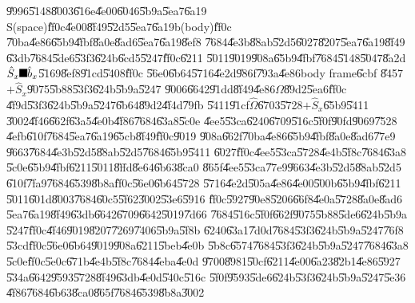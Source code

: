 \documentclass[12pt]{article}
\begin{document}
\begin{figure}[th]
\caption{{}}
\label{firstfig}
\begin{center}
\end{center}
\end{figure}
\bigskip

\U{9996}\U{5148}\U{8003}\U{616e}\U{4e00}\U{6046}\U{5b9a}\U{5ea7}\U{6a19}%
S(space)\U{ff0c}\U{4e00}\U{8f49}\U{52d5}\U{5ea7}\U{6a19}b(body)\U{ff0c}%
\U{70ba}\U{4e86}\U{65b9}\U{4fbf}\U{8a0e}\U{8ad6}\U{5ea7}\U{6a19}\U{8ef8}%
\U{7684}\U{4e3b}\U{88ab}\U{52d5}\U{6027}\U{8207}\U{5ea7}\U{6a19}\U{8f49}%
\U{63db}\U{7684}\U{5de6}\U{53f3}\U{624b}\U{6cd5}\U{5247}\U{ff0c}\U{6211}%
\U{5011}\U{9019}\U{908a}\U{65b9}\U{4fbf}\U{7684}\U{5148}\U{5047}\U{8a2d}$%
\hat{S}_{x}\U{ff0c} \hat{b}_{x}$\U{5169}\U{8ef8}\U{91cd}\U{5408}\U{ff0c}%
\U{56e0}\U{6b64}\U{5716}\U{4e2d}\U{986f}\U{793a}\U{4e86}body frame\U{6cbf}%
\U{8457}$+\hat{S}_{x}$\U{9075}\U{5b88}\U{53f3}\U{624b}\U{5b9a}\U{5247}%
\U{9006}\U{6642}\U{91dd}\U{8f49}\U{4e86}$\Omega $\U{89d2}\U{5ea6}\U{ff0c}%
\U{4f9d}\U{53f3}\U{624b}\U{5b9a}\U{5247}\U{6b64}\U{89d2}\U{4f4d}\U{79fb}%
\U{5411}\U{91cf}$\hat{\Omega}$\U{6703}\U{5728}$+\hat{S}_{x}$\U{65b9}\U{5411}%
\U{3002}\U{4f46}\U{662f}\U{63a5}\U{4e0b}\U{4f86}\U{7684}\U{63a8}\U{5c0e}%
\U{4ee5}\U{53ca}\U{6240}\U{6709}\U{516c}\U{5f0f}\U{90fd}\U{9069}\U{7528}%
\U{4efb}\U{610f}\U{7684}\U{5ea7}\U{6a19}\U{65cb}\U{8f49}\U{ff0c}\U{9019}%
\U{908a}\U{662f}\U{70ba}\U{4e86}\U{65b9}\U{4fbf}\U{8a0e}\U{8ad6}\U{77e9}%
\U{9663}\U{7684}\U{4e3b}\U{52d5}\U{88ab}\U{52d5}\U{7684}\U{65b9}\U{5411}%
\U{6027}\U{ff0c}\U{4ee5}\U{53ca}\U{5728}\U{4e4b}\U{5f8c}\U{7684}\U{63a8}%
\U{5c0e}\U{65b9}\U{4fbf}\U{6211}\U{5011}\U{8ffd}\U{8e64}\U{6b63}\U{8ca0}%
\U{865f}\U{4ee5}\U{53ca}\U{77e9}\U{9663}\U{4e3b}\U{52d5}\U{88ab}\U{52d5}%
\U{610f}\U{7fa9}\U{7684}\U{6539}\U{8b8a}\U{ff0c}\U{56e0}\U{6b64}\U{5728}%
\U{5716}\U{4e2d}\U{505a}\U{4e86}\U{4e00}\U{500b}\U{65b9}\U{4fbf}\U{6211}%
\U{5011}\U{601d}\U{8003}\U{7684}\U{60c5}\U{5f62}\U{3002}\U{53e6}\U{5916}%
\U{ff0c}\U{5927}\U{90e8}\U{5206}\U{66f8}\U{4e0a}\U{5728}\U{8a0e}\U{8ad6}%
\U{5ea7}\U{6a19}\U{8f49}\U{63db}\U{6642}\U{6709}\U{6642}\U{5019}\U{7d66}%
\U{7684}\U{516c}\U{5f0f}\U{662f}\U{9075}\U{5b88}\U{5de6}\U{624b}\U{5b9a}%
\U{5247}\U{ff0c}\U{4f46}\U{9019}\U{8207}\U{7269}\U{7406}\U{5b9a}\U{5f8b}%
\U{6240}\U{63a1}\U{7d0d}\U{7684}\U{53f3}\U{624b}\U{5b9a}\U{5247}\U{76f8}%
\U{53cd}\U{ff0c}\U{56e0}\U{6b64}\U{9019}\U{908a}\U{6211}\U{5beb}\U{4e0b}%
\U{5b8c}\U{6574}\U{7684}\U{53f3}\U{624b}\U{5b9a}\U{5247}\U{7684}\U{63a8}%
\U{5c0e}\U{ff0c}\U{5e0c}\U{671b}\U{4e4b}\U{5f8c}\U{7684}\U{4eba}\U{4e0d}%
\U{9700}\U{8981}\U{50cf}\U{6211}\U{4e00}\U{6a23}\U{82b1}\U{4e86}\U{5927}%
\U{534a}\U{6642}\U{9593}\U{5728}\U{8f49}\U{63db}\U{4e0d}\U{540c}\U{516c}%
\U{5f0f}\U{9593}\U{5de6}\U{624b}\U{53f3}\U{624b}\U{5b9a}\U{5247}\U{5e36}%
\U{4f86}\U{7684}\U{6b63}\U{8ca0}\U{865f}\U{7684}\U{6539}\U{8b8a}\U{3002}
\end{document}
